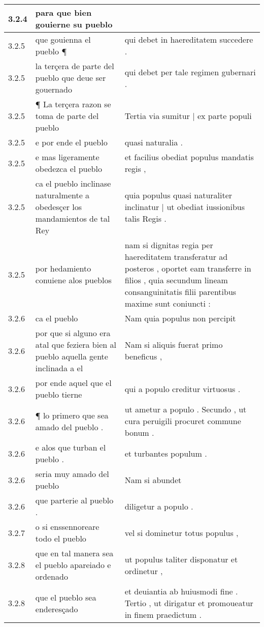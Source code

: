 \begin{tabular}{|p{1cm}|p{6.5cm}|p{6.5cm}|}
3.2.4 & para que bien gouierne su pueblo &  \\\hline
3.2.5 & que gouienna el pueblo ¶ & qui debet in haereditatem succedere . \\\hline
3.2.5 & la terçera de parte del pueblo que deue ser gouernado & qui debet per tale regimen gubernari . \\\hline
3.2.5 & ¶ La terçera razon se toma de parte del pueblo & Tertia via sumitur | ex parte populi \\\hline
3.2.5 & e por ende el pueblo & quasi naturalia . \\\hline
3.2.5 & e mas ligeramente obedezca el pueblo & et facilius obediat populus mandatis regis , \\\hline
3.2.5 & ca el pueblo inclinase naturalmente a obedesçer los mandamientos de tal Rey & quia populus quasi naturaliter inclinatur | ut obediat iussionibus talis Regis . \\\hline
3.2.5 & por hedamiento conuiene alos pueblos & nam si dignitas regia per haereditatem transferatur ad posteros , oportet eam transferre in filios , quia secundum lineam consanguinitatis filii parentibus maxime sunt coniuncti : \\\hline
3.2.6 & ca el pueblo & Nam quia populus non percipit \\\hline
3.2.6 & por que si alguno era atal que feziera bien al pueblo aquella gente inclinada a el & Nam si aliquis fuerat primo beneficus , \\\hline
3.2.6 & por ende aquel que el pueblo tierne & qui a populo creditur virtuosus . \\\hline
3.2.6 & ¶ lo primero que sea amado del pueblo . & ut ametur a populo . Secundo , ut cura peruigili procuret commune bonum . \\\hline
3.2.6 & e alos que turban el pueblo . & et turbantes populum . \\\hline
3.2.6 & seria muy amado del pueblo & Nam si abundet \\\hline
3.2.6 & que parterie al pueblo . & diligetur a populo . \\\hline
3.2.7 & o si enssennoreare todo el pueblo & vel si dominetur totus populus , \\\hline
3.2.8 & que en tal manera sea el pueblo apareiado e ordenado & ut populus taliter disponatur et ordinetur , \\\hline
3.2.8 & que el pueblo sea enderesçado & et deuiantia ab huiusmodi fine . Tertio , ut dirigatur et promoueatur in finem praedictum . \\\hline

\end{tabular}
